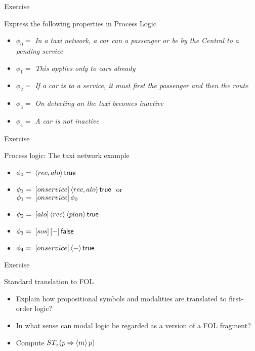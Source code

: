 \documentclass{beamer}
\begin{document}
\begin{slide}{Exercise}\label{s:26}
\small
\begin{exampleblock}{Express the following properties in Process Logic}
\begin{itemize}
\item $\phi_0 =$ \emph{In a taxi network, a car can  a passenger or be  by the Central to a pending service}
\item $\phi_1 =$ \emph{This applies only to cars already }
\item $\phi_2 =$
 \emph{If a car is  to a service, it must first  the passenger and then  the route}
\item $\phi_3 =$ \emph{On detecting an  the taxi becomes inactive}
\item $\phi_4 =$ \emph{A car  is not inactive}
\end{itemize}
\end{exampleblock}
\end{slide}

\begin{slide}{Exercise}\label{s:27}
\small
\begin{exampleblock}{Process logic: The taxi network example}
\begin{itemize}
\item $\phi_0 =\; \langle rec,alo \rangle\, \mathsf{true}$ 
\item $\phi_1 =\;  [onservice]\, \langle rec,alo \rangle\, \mathsf{true}\; $ or\\
$\phi_1 =\;   [onservice]\, \phi_0$
\item $\phi_2 =\;  [alo]\, \langle rec \rangle\, \langle plan \rangle\, \mathsf{true}$
\item $\phi_3 =\;  [sos]\, [-]\, \mathsf{false}$
\item $\phi_4 =\;  [onservice]\, \langle - \rangle\, \mathsf{true}$
\end{itemize}
\end{exampleblock}
\end{slide}


\begin{slide}{Exercise}\label{s:28}
\small
\begin{exampleblock}{Standard translation to FOL}
\begin{itemize}
\item Explain how propositional symbols and modalities are translated to first-order logic?
\item In what sense can modal logic be regarded as a  version of a FOL fragment?
\item Compute  $ST_x (p \mathbin{\Rightarrow} \langle m \rangle\, p)$ 
\end{itemize}
\end{exampleblock}
\end{slide}
\end{document}
